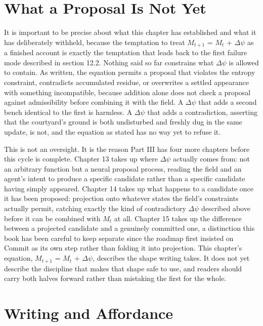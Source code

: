 \section{What a Proposal Is Not Yet}

It is important to be precise about what this chapter has established and what it has deliberately withheld, because the temptation to treat \(M_{t+1}\) = \(M_t\) + \(\Delta\psi\) as a finished account is exactly the temptation that leads back to the first failure mode described in section 12.2. Nothing said so far constrains what \(\Delta\psi\) is allowed to contain. As written, the equation permits a proposal that violates the entropy constraint, contradicts accumulated residue, or overwrites a settled appearance with something incompatible, because addition alone does not check a proposal against admissibility before combining it with the field. A \(\Delta\psi\) that adds a second bench identical to the first is harmless. A \(\Delta\psi\) that adds a contradiction, asserting that the courtyard's ground is both undisturbed and freshly dug in the same update, is not, and the equation as stated has no way yet to refuse it.

This is not an oversight. It is the reason Part III has four more chapters before this cycle is complete. Chapter 13 takes up where \(\Delta\psi\) actually comes from: not an arbitrary function but a neural proposal process, reading the field and an agent's intent to produce a specific candidate rather than a specific candidate having simply appeared. Chapter 14 takes up what happens to a candidate once it has been proposed: projection onto whatever states the field's constraints actually permit, catching exactly the kind of contradictory \(\Delta\psi\) described above before it can be combined with \(M_t\) at all. Chapter 15 takes up the difference between a projected candidate and a genuinely committed one, a distinction this book has been careful to keep separate since the roadmap first insisted on Commit as its own step rather than folding it into projection. This chapter's equation, \(M_{t+1}\) = \(M_t\) + \(\Delta\psi\), describes the shape writing takes. It does not yet describe the discipline that makes that shape safe to use, and readers should carry both halves forward rather than mistaking the first for the whole.

\section{Writing and Affordance}

